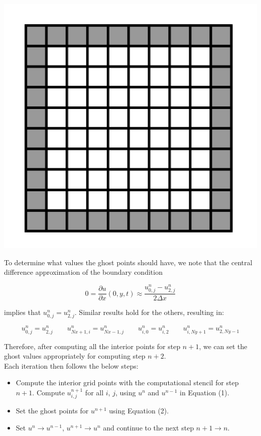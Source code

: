 \documentclass[12pt]{article}
\begin{document}
\begin{center}
\includegraphics[scale=0.9]{grid}
\end{center}

To determine what values the ghost points should have, we note that the central difference approximation of the boundary condition

$$
0 = \frac{\partial u}{\partial x}(0,y,t) \approx \frac{u^n_{0,j} - u^n_{2,j}}{2 \Delta x}
$$

implies that $u^n_{0,j} = u^n_{2,j}$.  Similar results hold for the others, resulting in:

\begin{equation}
u^n_{0,j} = u^n_{2,j} \qquad u^n_{Nx+1,i} = u^n_{Nx-1,j} \qquad u^n_{i,0} = u^n_{i,2} \qquad u^n_{i,Ny+1} = u^n_{2,Ny-1}
\end{equation}

Therefore, after computing all the interior points for step $n+1$, we can set the ghost values appropriately for computing step $n+2$. \\

Each iteration then follows the below steps:

\begin{itemize}
\item Compute the interior grid points with the computational stencil for step $n+1$.  Compute $u^{n+1}_{i,j}$ for all $i$, $j$, using $u^n$ and $u^{n-1}$ in Equation (1).
\item Set the ghost points for $u^{n+1}$ using Equation (2).
\item Set $u^{n} \rightarrow u^{n-1}$, $u^{n+1} \rightarrow u^{n}$ and continue to the next step $n+1 \rightarrow n$.
\end{itemize}
\end{document}
